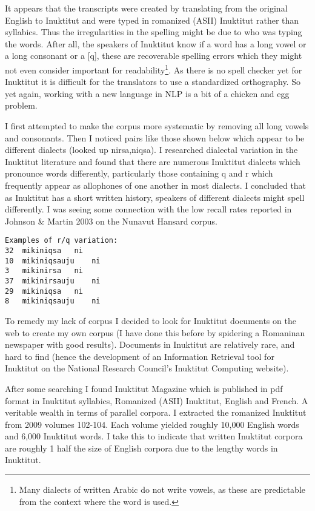 \documentclass[runningheads,a4paper]{llncs}
\begin{document}
It appears that the transcripts were created by translating from the original English to Inuktitut and were typed in romanized (ASII) Inuktitut rather than syllabics. Thus the irregularities in the spelling might be due to who was typing the words. After all, the speakers of Inuktitut know if a word has a long vowel or a long consonant or a [q], these are recoverable spelling errors which they might not even consider important for readability\footnote{Many dialects of written Arabic do not write vowels, as these are predictable from the context where the word is used.}. As there is no spell checker yet for Inuktitut it is difficult for the translators to use a standardized orthography. So yet again, working with a new language in NLP is a bit of a chicken and egg problem. 

I first attempted to make the corpus more systematic by removing all long vowels and consonants.  Then I noticed pairs like those shown below which appear to be different dialects (looked up nirsa,niqsa). I researched dialectal variation in the Inuktitut literature and found that there are numerous Inuktitut dialects which pronounce words differently, particularly those containing q and r which frequently appear as allophones of one another in most dialects. I concluded that as Inuktitut has a short written history,  speakers of different dialects might spell differently. I was seeing some connection with the low recall rates reported in Johnson \& Martin 2003 on the Nunavut Hansard corpus.

\begin{verbatim}
Examples of r/q variation:
32	mikiniqsa	ni
10	mikiniqsauju	ni
3	mikinirsa	ni
37	mikinirsauju	ni
29	mikiniqsa	ni
8	mikiniqsauju	ni
\end{verbatim}

To remedy my lack of corpus I decided to look for Inuktitut documents on the web to create my own corpus (I have done this before by spidering a Romaninan newspaper with good results). Documents in Inuktitut are relatively rare, and hard to find (hence the development of an Information Retrieval tool for Inuktitut on the National Research Council's Inuktitut Computing website). 

After some searching I found Inuktitut Magazine which is published in pdf format in Inuktitut syllabics, Romanized (ASII) Inuktitut, English and French. A veritable wealth in terms of parallel corpora. I extracted the romanized Inuktitut from 2009 volumes 102-104. Each volume yielded roughly 10,000 English words and 6,000 Inuktitut words. I take this to indicate that written Inuktitut corpora are roughly 1 half the size of English corpora due to the lengthy words in Inuktitut. 
\end{document}

